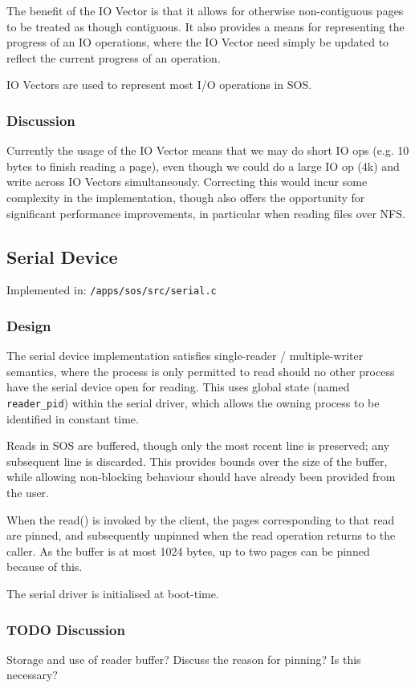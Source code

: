 \documentclass[a4paper,12pt]{article}
\begin{document}
The benefit of the IO Vector is that it allows for otherwise non-contiguous
pages to be treated as though contiguous.  It also provides a means for
representing the progress of an IO operations, where the IO Vector need simply
be updated to reflect the current progress of an operation.

IO Vectors are used to represent most I/O operations in SOS.

\subsubsection{Discussion}
Currently the usage of the IO Vector means that we may do short IO ops
(e.g. 10 bytes to finish reading a page), even though we could do a large IO
op (4k) and write across IO Vectors simultaneously.  Correcting this would
incur some complexity in the implementation, though also offers the
opportunity for significant performance improvements, in particular when
reading files over NFS.

\subsection{Serial Device}
Implemented in: \texttt{/apps/sos/src/serial.c}

\subsubsection{Design}
The serial device implementation satisfies single-reader / multiple-writer
semantics, where the process is only permitted to read should no other process
have the serial device open for reading.  This uses global state (named
\texttt{reader\_pid}) within the serial driver, which allows the owning process to be
identified in constant time.

Reads in SOS are buffered, though only the most recent line is preserved; any
subsequent line is discarded.  This provides bounds over the size of the
buffer, while allowing non-blocking behaviour should have already been
provided from the user.

When the read() is invoked by the client, the pages corresponding to that read
are pinned, and subsequently unpinned when the read operation returns to the
caller.  As the buffer is at most 1024 bytes, up to two pages can be pinned
because of this.

The serial driver is initialised at boot-time.

\subsubsection{TODO Discussion}
Storage and use of reader buffer?  Discuss the reason for pinning?  Is this necessary?
\end{document}
